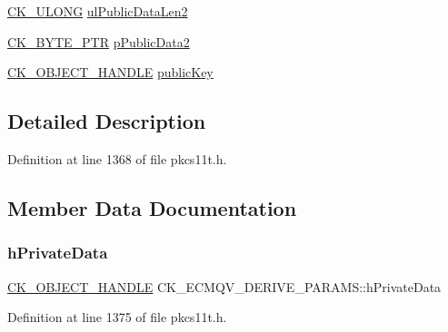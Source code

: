 \begin{DoxyCompactItemize}
\item 
\hyperlink{pkcs11t_8h_a35181858a3b7a0a81f49d180d8f446ef}{C\+K\+\_\+\+U\+L\+O\+NG} \hyperlink{struct_c_k___e_c_m_q_v___d_e_r_i_v_e___p_a_r_a_m_s_a433e51c98a2ad536c8a69706c04c6193}{ul\+Public\+Data\+Len2}
\item 
\hyperlink{pkcs11t_8h_a3d7233a4077fbaf7ae76b64da0a62a21}{C\+K\+\_\+\+B\+Y\+T\+E\+\_\+\+P\+TR} \hyperlink{struct_c_k___e_c_m_q_v___d_e_r_i_v_e___p_a_r_a_m_s_a0bd74ccfdd71d504ec8a24dc058c7b9d}{p\+Public\+Data2}
\item 
\hyperlink{pkcs11t_8h_ad1cdd703196214cd34e6f9f52bc67683}{C\+K\+\_\+\+O\+B\+J\+E\+C\+T\+\_\+\+H\+A\+N\+D\+LE} \hyperlink{struct_c_k___e_c_m_q_v___d_e_r_i_v_e___p_a_r_a_m_s_a81e24515ecc90a3deb1995b7e8303d9c}{public\+Key}
\end{DoxyCompactItemize}


\subsection{Detailed Description}


Definition at line 1368 of file pkcs11t.\+h.



\subsection{Member Data Documentation}
\mbox{\label{struct_c_k___e_c_m_q_v___d_e_r_i_v_e___p_a_r_a_m_s_a9ba1429299801b8e12bf02367d8c0c55}} 
\subsubsection{\texorpdfstring{h\+Private\+Data}{hPrivateData}}
{\footnotesize\ttfamily \hyperlink{pkcs11t_8h_ad1cdd703196214cd34e6f9f52bc67683}{C\+K\+\_\+\+O\+B\+J\+E\+C\+T\+\_\+\+H\+A\+N\+D\+LE} C\+K\+\_\+\+E\+C\+M\+Q\+V\+\_\+\+D\+E\+R\+I\+V\+E\+\_\+\+P\+A\+R\+A\+M\+S\+::h\+Private\+Data}



Definition at line 1375 of file pkcs11t.\+h.

